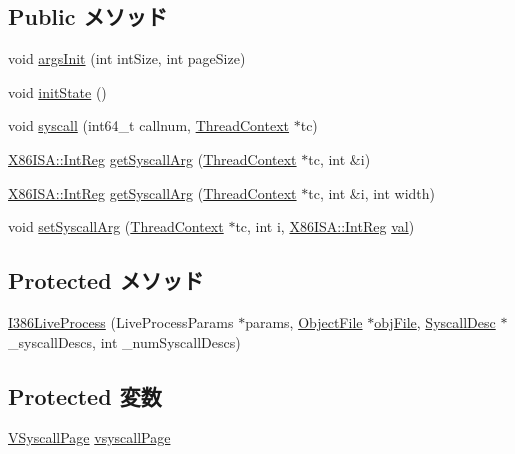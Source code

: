 \subsection*{Public メソッド}
\begin{DoxyCompactItemize}
\item 
void \hyperlink{classX86ISA_1_1I386LiveProcess_a60e5314ffeede1e51c6bcb2cf606ca92}{argsInit} (int intSize, int pageSize)
\item 
void \hyperlink{classX86ISA_1_1I386LiveProcess_a3c34ea9b29f410748d4435a667484924}{initState} ()
\item 
void \hyperlink{classX86ISA_1_1I386LiveProcess_a1ed38802271de4269c3adfa46c73e7e7}{syscall} (int64\_\-t callnum, \hyperlink{classThreadContext}{ThreadContext} $\ast$tc)
\item 
\hyperlink{namespaceX86ISA_a0e080577527fb3e9685399f75b5caf15}{X86ISA::IntReg} \hyperlink{classX86ISA_1_1I386LiveProcess_a6f33c62983b3e68106d1cdb43b9fc09c}{getSyscallArg} (\hyperlink{classThreadContext}{ThreadContext} $\ast$tc, int \&i)
\item 
\hyperlink{namespaceX86ISA_a0e080577527fb3e9685399f75b5caf15}{X86ISA::IntReg} \hyperlink{classX86ISA_1_1I386LiveProcess_afe872a4ad58edd7774a108ac2ff35d60}{getSyscallArg} (\hyperlink{classThreadContext}{ThreadContext} $\ast$tc, int \&i, int width)
\item 
void \hyperlink{classX86ISA_1_1I386LiveProcess_a834e8e05416e3487f87d942259506abe}{setSyscallArg} (\hyperlink{classThreadContext}{ThreadContext} $\ast$tc, int i, \hyperlink{namespaceX86ISA_a0e080577527fb3e9685399f75b5caf15}{X86ISA::IntReg} \hyperlink{namespaceX86ISA_ae13bf1250853ff6b72aabe3c79b587cc}{val})
\end{DoxyCompactItemize}
\subsection*{Protected メソッド}
\begin{DoxyCompactItemize}
\item 
\hyperlink{classX86ISA_1_1I386LiveProcess_a6556f426be989188ef0a961836b3b490}{I386LiveProcess} (LiveProcessParams $\ast$params, \hyperlink{classObjectFile}{ObjectFile} $\ast$\hyperlink{classLiveProcess_ab6cfcfa7903c66267b3e0351c3caa809}{objFile}, \hyperlink{classSyscallDesc}{SyscallDesc} $\ast$\_\-syscallDescs, int \_\-numSyscallDescs)
\end{DoxyCompactItemize}
\subsection*{Protected 変数}
\begin{DoxyCompactItemize}
\item 
\hyperlink{classX86ISA_1_1I386LiveProcess_1_1VSyscallPage}{VSyscallPage} \hyperlink{classX86ISA_1_1I386LiveProcess_a9f7ed190dd32bddc3f1074ce39168abd}{vsyscallPage}
\end{DoxyCompactItemize}


